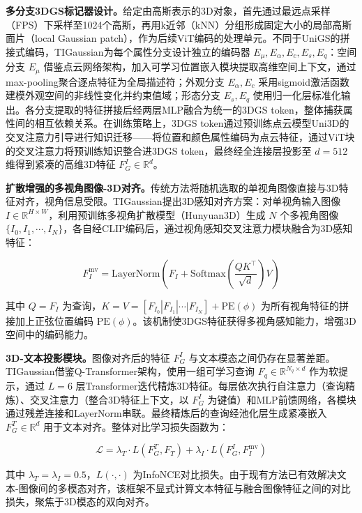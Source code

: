 \textbf{多分支3DGS标记器设计。}给定由高斯表示的3D对象，首先通过最远点采样（FPS）下采样至1024个高斯，再用k近邻（kNN）分组形成固定大小的局部高斯面片（local Gaussian patch），作为后续ViT编码的处理单元。不同于UniGS的拼接式编码，TIGaussian为每个属性分支设计独立的编码器 $E_\mu, E_\alpha, E_c, E_s, E_q$：空间分支 $E_\mu$ 借鉴点云网络架构，加入可学习位置嵌入模块提取高维空间上下文，通过max-pooling聚合逐点特征为全局描述符；外观分支 $E_\alpha, E_c$ 采用sigmoid激活函数建模外观空间的非线性变化并约束值域；形态分支 $E_s, E_q$ 使用归一化层标准化输出。各分支提取的特征拼接后经两层MLP融合为统一的3DGS token，整体捕获属性间的相互依赖关系。在训练策略上，3DGS token通过预训练点云模型Uni3D的交叉注意力引导进行知识迁移——将位置和颜色属性编码为点云特征，通过ViT块的交叉注意力将预训练知识整合进3DGS token，最终经全连接层投影至 $d=512$ 维得到紧凑的高维3D特征 $F_G^I \in \mathbb{R}^d$。

\textbf{扩散增强的多视角图像-3D对齐。}传统方法将随机选取的单视角图像直接与3D特征对齐，视角信息受限。TIGaussian提出3D感知对齐方案：对单视角输入图像 $I \in \mathbb{R}^{H \times W}$，利用预训练多视角扩散模型（Hunyuan3D）生成 $N$ 个多视角图像 $\{I_0, I_1, \cdots, I_N\}$，各自经CLIP编码后，通过视角感知交叉注意力模块融合为3D感知特征：

\begin{equation}
F_I^{\text{mv}} = \text{LayerNorm}\!\left(F_I + \text{Softmax}\!\left(\frac{QK^\top}{\sqrt{d}}\right)V\right)
\end{equation}

其中 $Q = F_I$ 为查询，$K = V = [F_{I_0} | F_{I_1} | \cdots | F_{I_N}] + \text{PE}(\phi)$ 为所有视角特征的拼接加上正弦位置编码 $\text{PE}(\phi)$。该机制使3DGS特征获得多视角感知能力，增强3D空间中的编码能力。

\textbf{3D-文本投影模块。}图像对齐后的特征 $F_G^I$ 与文本模态之间仍存在显著差距。TIGaussian借鉴Q-Transformer架构，使用一组可学习查询 $F_q \in \mathbb{R}^{N_q \times d}$ 作为软提示，通过 $L=6$ 层Transformer迭代精炼3D特征。每层依次执行自注意力（查询精炼）、交叉注意力（整合3D特征上下文，以 $F_G^I$ 为键值）和MLP前馈网络，各模块通过残差连接和LayerNorm串联。最终精炼后的查询经池化层生成紧凑嵌入 $F_G^T \in \mathbb{R}^d$ 用于文本对齐。整体对比学习损失函数为：

\begin{equation}
\mathcal{L} = \lambda_T \cdot L(F_G^T, F_T) + \lambda_I \cdot L(F_G^I, F_I^{\text{mv}})
\end{equation}

其中 $\lambda_T = \lambda_I = 0.5$，$L(\cdot,\cdot)$ 为InfoNCE对比损失。由于现有方法已有效解决文本-图像间的多模态对齐，该框架不显式计算文本特征与融合图像特征之间的对比损失，聚焦于3D模态的双向对齐。

